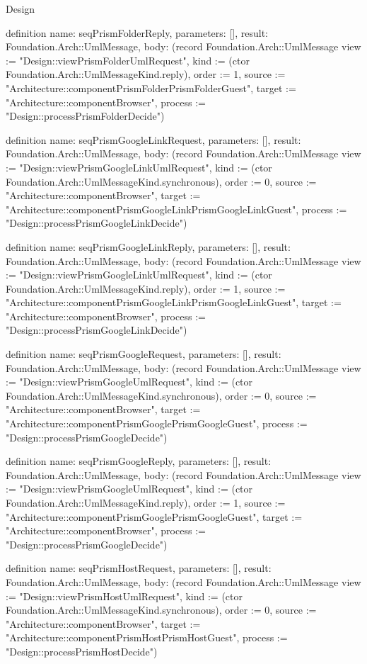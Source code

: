\begin{lexlean}{Design}
\begin{semanticmodule}
definition{
  name: seqPrismFolderReply,
  parameters: [],
  result: Foundation.Arch::UmlMessage,
  body: (record Foundation.Arch::UmlMessage {view := "Design::viewPrismFolderUmlRequest", kind := (ctor Foundation.Arch::UmlMessageKind.reply), order := 1, source := "Architecture::componentPrismFolderPrismFolderGuest", target := "Architecture::componentBrowser", process := "Design::processPrismFolderDecide"})
}

definition{
  name: seqPrismGoogleLinkRequest,
  parameters: [],
  result: Foundation.Arch::UmlMessage,
  body: (record Foundation.Arch::UmlMessage {view := "Design::viewPrismGoogleLinkUmlRequest", kind := (ctor Foundation.Arch::UmlMessageKind.synchronous), order := 0, source := "Architecture::componentBrowser", target := "Architecture::componentPrismGoogleLinkPrismGoogleLinkGuest", process := "Design::processPrismGoogleLinkDecide"})
}

definition{
  name: seqPrismGoogleLinkReply,
  parameters: [],
  result: Foundation.Arch::UmlMessage,
  body: (record Foundation.Arch::UmlMessage {view := "Design::viewPrismGoogleLinkUmlRequest", kind := (ctor Foundation.Arch::UmlMessageKind.reply), order := 1, source := "Architecture::componentPrismGoogleLinkPrismGoogleLinkGuest", target := "Architecture::componentBrowser", process := "Design::processPrismGoogleLinkDecide"})
}

definition{
  name: seqPrismGoogleRequest,
  parameters: [],
  result: Foundation.Arch::UmlMessage,
  body: (record Foundation.Arch::UmlMessage {view := "Design::viewPrismGoogleUmlRequest", kind := (ctor Foundation.Arch::UmlMessageKind.synchronous), order := 0, source := "Architecture::componentBrowser", target := "Architecture::componentPrismGooglePrismGoogleGuest", process := "Design::processPrismGoogleDecide"})
}

definition{
  name: seqPrismGoogleReply,
  parameters: [],
  result: Foundation.Arch::UmlMessage,
  body: (record Foundation.Arch::UmlMessage {view := "Design::viewPrismGoogleUmlRequest", kind := (ctor Foundation.Arch::UmlMessageKind.reply), order := 1, source := "Architecture::componentPrismGooglePrismGoogleGuest", target := "Architecture::componentBrowser", process := "Design::processPrismGoogleDecide"})
}

definition{
  name: seqPrismHostRequest,
  parameters: [],
  result: Foundation.Arch::UmlMessage,
  body: (record Foundation.Arch::UmlMessage {view := "Design::viewPrismHostUmlRequest", kind := (ctor Foundation.Arch::UmlMessageKind.synchronous), order := 0, source := "Architecture::componentBrowser", target := "Architecture::componentPrismHostPrismHostGuest", process := "Design::processPrismHostDecide"})
}


\end{semanticmodule}
\end{lexlean}
